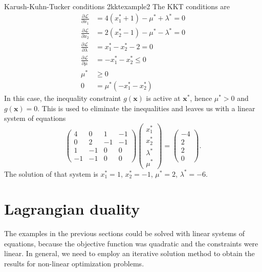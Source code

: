 \begin{example}{Karush-Kuhn-Tucker conditions 2}{kktexample2}
    The KKT conditions are 
    \begin{align}
        \frac{\partial \mathcal{L}}{\partial x_1} &= 4 (x_1^* + 1) - \mu^* + \lambda^*  = 0\\
        \frac{\partial \mathcal{L}}{\partial x_2} &= 2 (x_2^* - 1) - \mu^* - \lambda^*  = 0\\
        \frac{\partial \mathcal{L}}{\partial \lambda} &= x_1^* - x_2^* - 2 = 0 \\
        \label{eq:kkt_example2_in}
        \frac{\partial \mathcal{L}}{\partial \mu} &= -x_1^*-x_2^* \le 0 \\
        \mu^* &\ge 0 \\
        0 &= \mu^*(-x_1^*-x_2^*)
        \label{eq:kkt_example2_comp}
    \end{align}
    In this case, the inequality constraint $g(\mathbf{x})$ is active at $\mathbf{x}^*$, hence $\mu^* > 0$ and $g(\mathbf{x})=0$. This is used to eliminate the inequalities and leaves us with a linear system of equations 
    \begin{equation}
        \begin{pmatrix}
        4  & 0  & 1 & -1  \\
        0  & 2  & -1 & -1 \\ 
        1  & -1 & 0  & 0  \\
        -1 & -1 & 0  & 0
        \end{pmatrix} 
        \begin{pmatrix}
        x_1^* \\ x_2^* \\ \lambda^* \\ \mu^*  
        \end{pmatrix} 
        = 
        \begin{pmatrix}
        -4 \\ 2 \\ 2\\ 0
        \end{pmatrix} 
        .
    \end{equation}
    The solution of that system is $x_1^*=1$, $x_2^*=-1$, $\mu^*=2$, $\lambda^*=-6$.
\end{example}

\section{Lagrangian duality}
The examples in the previous sections could be solved with linear systems of equations, because the objective function was quadratic and the constraints were linear. In general, we need to employ an iterative solution method to obtain the results for non-linear optimization problems. 

